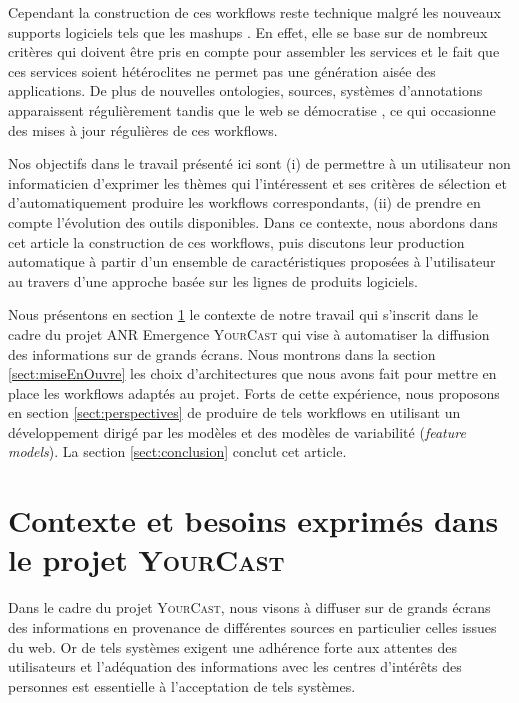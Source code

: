 \documentclass[]{easychair}
\newcommand{\comment}[4]{\par\noindent\hspace*{-0.5cm}{\parbox{\columnwidth}{\textbf{\color{#1}//#2[#3]:#4}}}\par}
\newcommand{\mi}[1]{\comment{blue}{}{#1}{MI}}
\newcommand{\ch}[1]{\comment{green}{}{#1}{CH}}
\newcommand{\Y}[0]{\textsc{YourCast}\xspace}
\begin{document}
Cependant la construction de ces workflows reste technique malgré les nouveaux supports logiciels tels que les mashups \cite{Floyd2007} \cite{Milanovic2004}. En effet, elle se base sur de nombreux critères qui doivent être pris en compte pour assembler les services et le fait que ces services soient hétéroclites ne permet pas une génération aisée des applications. 
De plus de nouvelles ontologies, sources, systèmes d'annotations apparaissent régulièrement tandis que le web se démocratise \cite{Anderruthy2007} \cite{Bross2010}, ce qui occasionne des mises à jour régulières de ces workflows.

Nos objectifs dans le travail présenté ici sont (i) de permettre à un utilisateur non informaticien d'exprimer les thèmes qui l'intéressent et ses critères de sélection et d'automatiquement produire les workflows correspondants, (ii) de prendre en compte l'évolution des outils disponibles. 
Dans ce contexte, nous abordons dans cet article la construction de ces workflows, puis discutons leur production automatique  à partir d'un ensemble de caractéristiques proposées à l'utilisateur au travers d'une approche basée sur les lignes de produits logiciels. 

Nous présentons en section \ref{sect:exemple} le contexte de notre travail qui s'inscrit dans le cadre du projet ANR Emergence \Y qui vise à automatiser la diffusion des informations sur de grands écrans. 
Nous montrons dans la section \ref{sect:miseEnOuvre} les choix d'architectures  que nous avons fait pour mettre en place les workflows adaptés au projet. Forts de cette expérience, nous proposons en section \ref{sect:perspectives} de produire de tels workflows en utilisant un développement dirigé par les modèles et des modèles de variabilité (\textit{feature models})\cite{Report1990}.  La section \ref{sect:conclusion} conclut cet article. 



\section{Contexte et besoins exprimés dans le projet \Y}
\label{sect:exemple}
Dans le cadre du projet \Y, nous visons à diffuser sur de grands écrans des informations en provenance de différentes sources en particulier celles issues du web. Or de tels systèmes exigent une adhérence forte aux attentes des utilisateurs et l'adéquation des informations avec les centres d'intérêts des personnes est essentielle à l'acceptation de tels systèmes. 
\end{document}
